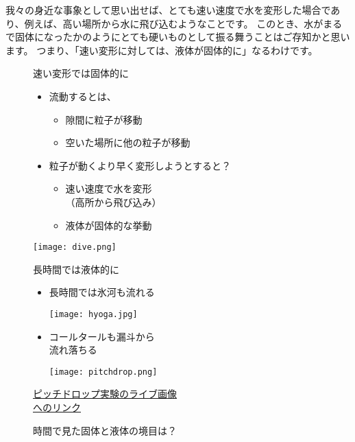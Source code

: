 \documentclass[uplatex,dvipdfmx,a4paper,11pt]{jsarticle}
\begin{document}
我々の身近な事象として思い出せば、とても速い速度で水を変形した場合であり、例えば、高い場所から水に飛び込むようなことです。
このとき、水がまるで固体になったかのようにとても硬いものとして振る舞うことはご存知かと思います。
つまり、「速い変形に対しては、液体が固体的に」なるわけです。
\begin{figure}[htb]
	\begin{center}
		\begin{minipage}{0.44\textwidth}
			\begin{center}
			\large
			\begin{itembox}[l]{速い変形では固体的に}
				\begin{itemize}
					\item 流動するとは、
					\begin{itemize}
						\item 隙間に粒子が移動
						\item 空いた場所に他の粒子が移動
					\end{itemize}
					\item 粒子が動くより早く変形しようとすると？
					\begin{itemize}
						\item 速い速度で水を変形\\（高所から飛び込み）
						\item 液体が固体的な挙動
					\end{itemize}
				\end{itemize}
			\end{itembox}
			\texttt{[image: dive.png]}
			\end{center}
		\end{minipage}
		\begin{minipage}{0.46\textwidth}
			\begin{center}
			\large
			\begin{itembox}[l]{長時間では液体的に}
				\begin{itemize}
					\item 長時間では氷河も流れる
					
					\texttt{[image: hyoga.jpg]}
					\item コールタールも漏斗から\\流れ落ちる	
					
					\texttt{[image: pitchdrop.png]}
				\end{itemize}

				\href{https://livestream.com/accounts/4931571/events/5369913}
				{ピッチドロップ実験のライブ画像\\へのリンク}
			\end{itembox}
			\end{center}
		\end{minipage}
		\caption{時間で見た固体と液体の境目は？}
		\label{fig:kotai_ekitai}
	\end{center}
\end{figure}
\end{document}
